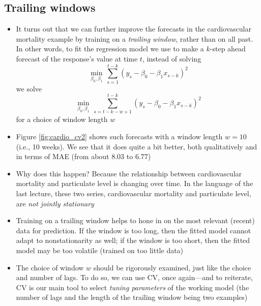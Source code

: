 \documentclass{article}
\begin{document}
\subsection{Trailing windows}

\begin{itemize}
\item It turns out that we can further improve the forecasts in the
  cardiovascular mortality example by training on a \emph{trailing window},
  rather than on all past. In other words, to fit the regression model we use to 
  make a $k$-step ahead forecast of the response's value at time $t$, instead of 
  solving    
  \[
  \min_{\beta_0,\beta_1} \, \sum_{s=1}^{t-k} (y_s - \beta_0 - \beta_1 x_{s-k})^2
  \]
  we solve
  \[
  \min_{\beta_0,\beta_1} \, \sum_{s={t-k-w+1}}^{t-k} (y_s - \beta_0 - \beta_1
  x_{s-k})^2 
  \]
  for a choice of window length $w$

\item Figure \ref{fig:cardio_cv2} shows such forecasts with a window length $w = 
  10$ (i.e., 10 weeks). We see that it does quite a bit better, both
  qualitatively and in terms of MAE (from about 8.03 to 6.77) 

\item Why does this happen? Because the relationship between cardiovascular
  mortality and particulate level is changing over time. In the language of the
  last lecture, these two series, cardiovascular mortality and particulate
  level, are \emph{not jointly stationary} 

\item Training on a trailing window helps to hone in on the most relevant
  (recent) data for prediction. If the window is too long, then the fitted model
  cannot adapt to nonstationarity as well; if the window is too short, then the
  fitted model may be too volatile (trained on too little data)

\item The choice of window $w$ should be rigorously examined, just like the 
  choice and number of lags. To do so, we can use CV, once again---and to
  reiterate, CV is our main tool to select \emph{tuning parameters} of the
  working model (the number of lags and the length of the trailing window being
  two examples) 
\end{itemize}
\end{document}
